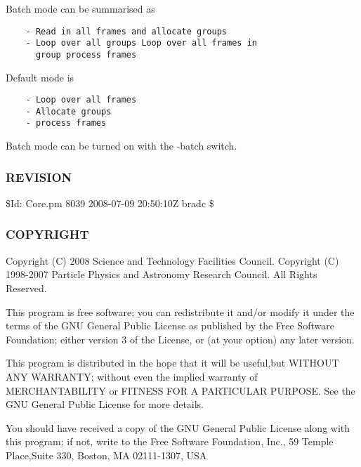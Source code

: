 \begin{description}
\begin{enumerate}
Batch mode can be summarised as

\begin{verbatim}
    - Read in all frames and allocate groups 
    - Loop over all groups Loop over all frames in
      group process frames
\end{verbatim}


Default mode is

\begin{verbatim}
    - Loop over all frames 
    - Allocate groups 
    - process frames
\end{verbatim}


Batch mode can be turned on with the -batch switch.

\end{enumerate}
\end{description}
\subsubsection*{REVISION\label{ORAC::Core_REVISION}}


\$Id: Core.pm 8039 2008-07-09 20:50:10Z bradc \$

\subsubsection*{COPYRIGHT\label{ORAC::Core_COPYRIGHT}}


Copyright (C) 2008 Science and Technology Facilities Council.
Copyright (C) 1998-2007 Particle Physics and Astronomy Research
Council. All Rights Reserved.



This program is free software; you can redistribute it and/or modify it under
the terms of the GNU General Public License as published by the Free Software
Foundation; either version 3 of the License, or (at your option) any later
version.



This program is distributed in the hope that it will be useful,but WITHOUT ANY
WARRANTY; without even the implied warranty of MERCHANTABILITY or FITNESS FOR A
PARTICULAR PURPOSE. See the GNU General Public License for more details.



You should have received a copy of the GNU General Public License along with
this program; if not, write to the Free Software Foundation, Inc., 59 Temple
Place,Suite 330, Boston, MA  02111-1307, USA

